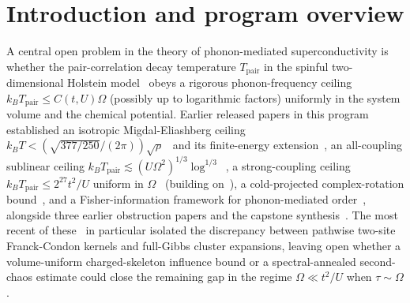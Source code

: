 \documentclass[11pt]{article}
\theoremstyle{definition}
\theoremstyle{remark}
\newcommand{\Tpair}{T_{\mathrm{pair}}}
\begin{document}
\section{Introduction and program overview}
\label{sec:intro}
A central open problem in the theory of phonon-mediated superconductivity is
whether the pair-correlation decay temperature $\Tpair$ in the spinful
two-dimensional Holstein model~\cite{holstein1959} obeys a rigorous phonon-frequency ceiling
$k_B \Tpair \le C(t,U)\Omega$ (possibly up to logarithmic factors) uniformly in
the system volume and the chemical potential. Earlier released papers in this
program established an isotropic Migdal-Eliashberg ceiling
$k_B T < (\sqrt{377/250}/(2\pi))\sqrt{\rho}$~\cite{optimum} and its
finite-energy extension~\cite{finiteenergy}, an all-coupling sublinear ceiling
$k_B \Tpair \lesssim (U\Omega^2)^{1/3}\log^{1/3}$~\cite{linear4}, a
strong-coupling ceiling $k_B \Tpair \le 2^{27}t^2/U$ uniform in
$\Omega$~\cite{stage6} (building on~\cite{strong}), a cold-projected
complex-rotation bound~\cite{largeu}, and a Fisher-information framework for
phonon-mediated order~\cite{fisher}, alongside three earlier obstruction papers
\cite{barriers1,barriers2,barriers3} and the capstone synthesis~\cite{capstone}.
The most recent of these~\cite{barriers3} in particular isolated the discrepancy between
pathwise two-site Franck-Condon kernels and full-Gibbs cluster expansions,
leaving open whether a volume-uniform charged-skeleton influence bound or a
spectral-annealed second-chaos estimate could close the remaining gap in the
regime $\Omega \ll t^2/U$ when $\tau \sim \Omega$.
\end{document}
